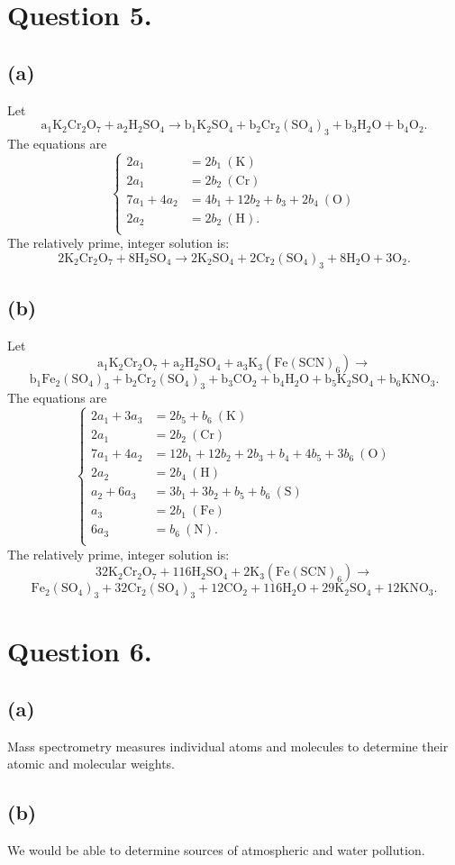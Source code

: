 \documentclass{article}
\begin{document}
\section*{Question 5.}
\subsection*{(a)}
Let
$$
\mathrm{
a_1K_2Cr_2O_7 + a_2H_2SO_4 \rightarrow b_1K_2SO_4 + b_2Cr_2(SO_4)_3 + b_3H_2O + b_4O_2
}.
$$
The equations are
$$
\begin{cases}
    2a_1 &= 2b_1 \mathrm{~(K)}\\
    2a_1 &= 2b_2 \mathrm{~(Cr)}\\
    7a_1 + 4a_2 &= 4b_1  + 12b_2 + b_3 + 2b_4 \mathrm{~(O)}\\
    2a_2 &= 2b_2 \mathrm{~(H)}.\\
\end{cases}
$$
The relatively prime, integer solution is:
$$
\mathrm{
2K_2Cr_2O_7 + 8H_2SO_4 \rightarrow 2K_2SO_4 + 2Cr_2(SO_4)_3 + 8H_2O + 3O_2
}.
$$
\subsection*{(b)}
Let
$$
\mathrm{
a_1K_2Cr_2O_7 + a_2H_2SO_4 + a_3K_3(Fe(SCN)_6) \rightarrow
}
$$
$$
\mathrm{
b_1Fe_2(SO_4)_3 + b_2Cr_2(SO_4)_3 + b_3CO_2 + b_4H_2O + b_5K_2SO_4 + b_6KNO_3
}.
$$
The equations are
$$
\begin{cases}
    2a_1 + 3a_3 &= 2b_5 + b_6 \mathrm{~(K)}\\
    2a_1 &= 2b_2 \mathrm{~(Cr)}\\
    7a_1 + 4a_2 &= 12b_1  + 12b_2 + 2b_3 + b_4 + 4b_5 + 3b_6 \mathrm{~(O)}\\
    2a_2 &= 2b_4 \mathrm{~(H)}\\
    a_2 + 6a_3 &= 3b_1 + 3b_2 + b_5 + b_6 \mathrm{~(S)}\\
    a_3 &= 2b_1 \mathrm{~(Fe)}\\
    6a_3 &= b_6 \mathrm{~(N)}.\\
\end{cases}
$$
The relatively prime, integer solution is:
\[
\mathrm{
32K_2Cr_2O_7 + 116H_2SO_4 + 2K_3(Fe(SCN)_6) \rightarrow
}
\]
$$
\mathrm{
Fe_2(SO_4)_3 + 32Cr_2(SO_4)_3 + 12CO_2 + 116H_2O + 29K_2SO_4 + 12KNO_3
}.
$$
\newpage

\section*{Question 6.}
\subsection*{(a)}
Mass spectrometry measures individual atoms and molecules to determine their atomic and molecular weights. 
\subsection*{(b)}
We would be able to determine sources of atmospheric and water pollution.
\newpage
\end{document}
